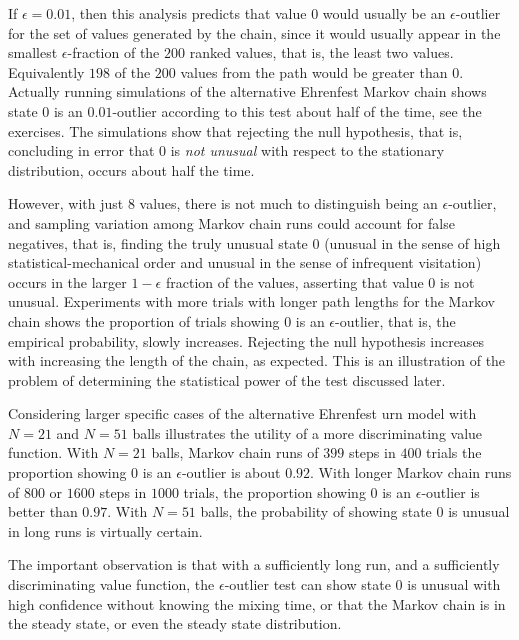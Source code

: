 \documentclass[12pt]{article}
\begin{document}
\begin{example}
\begin{example}
    If \( \epsilon = 0.01 \), then this analysis predicts that value \(
    0 \) would usually be an \( \epsilon \)-outlier for the set of
    values generated by the chain, since it would usually appear in the
    smallest \( \epsilon \)-fraction of the \( 200 \) ranked values,
    that is, the least two values.  Equivalently \( 198 \) of the \( 200
    \) values from the path would be greater than \( 0 \).  Actually
    running simulations of the alternative Ehrenfest Markov chain shows
    state \( 0 \) is an \( 0.01 \)-outlier according to this test about
    half of the time, see the exercises.  The simulations show that
    rejecting the null hypothesis, that is, concluding in error that \(
    0 \) is \emph{not unusual} with respect to the stationary
    distribution, occurs about half the time.

    However, with just \( 8 \) values, there is not much to distinguish
    being an \( \epsilon \)-outlier, and sampling variation among Markov
    chain runs could account for false negatives, that is, finding the
    truly unusual state \( 0 \) (unusual in the sense of high
    statistical-mechanical order and unusual in the sense of infrequent
    visitation) occurs in the larger \( 1 - \epsilon \) fraction of the
    values, asserting that value \( 0 \) is not unusual.  Experiments
    with more trials with longer path lengths for the Markov chain shows
    the proportion of trials showing \( 0 \) is an \( \epsilon \)-outlier,
    that is, the empirical probability, slowly increases.  Rejecting the
    null hypothesis increases with increasing the length of the chain,
    as expected.  This is an illustration of the problem of determining
    the statistical power of the test discussed later.

    Considering larger specific cases of the alternative Ehrenfest urn
    model%
    with \( N = 21 \) and \( N = 51 \) balls illustrates the utility of
    a more discriminating value function.  With \( N = 21 \) balls,
    Markov chain runs of \( 399 \) steps in \( 400 \) trials the
    proportion showing \( 0 \) is an \( \epsilon \)-outlier is about \(
    0.92 \).  With longer Markov chain runs of \( 800 \) or \( 1600 \)
    steps in \( 1000 \) trials, the proportion showing \( 0 \) is an \(
    \epsilon \)-outlier is better than \( 0.97 \).  With \( N = 51 \)
    balls, the probability of showing state \( 0 \) is unusual in long
    runs is virtually certain.

    The important observation is that with a sufficiently long run, and
    a sufficiently discriminating value function, the \( \epsilon \)-outlier
    test can show state \( 0 \) is unusual with high confidence without
    knowing the mixing time, or that the Markov chain is in the steady
    state, or even the steady state distribution.


\end{example}
\end{example}
\end{document}
